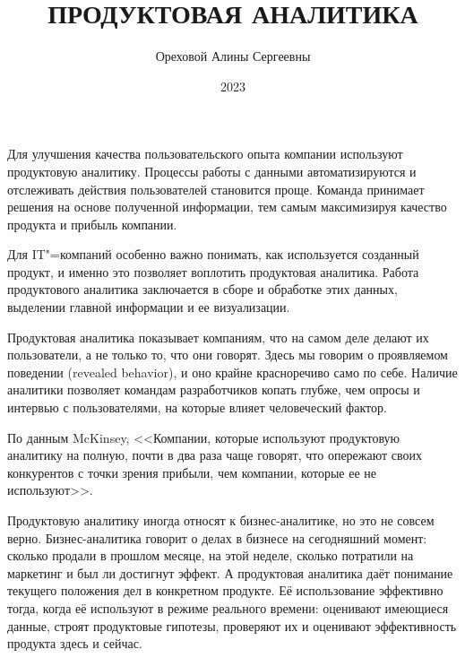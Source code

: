 \documentclass[referat, times]{SCWorks}
\begin{document}

\title{ПРОДУКТОВАЯ АНАЛИТИКА}




\author{Ореховой Алины Сергеевны}

\date{2023}

\maketitle

\tableofcontents

\intro
Для улучшения качества пользовательского опыта компании используют продуктовую аналитику. Процессы работы с данными автоматизируются и отслеживать действия пользователей становится проще. Команда принимает решения на основе полученной информации, тем самым максимизируя качество продукта и прибыль компании.

Для IT"=компаний особенно важно понимать, как используется созданный продукт, и именно это позволяет воплотить продуктовая аналитика. Работа продуктового аналитика заключается в сборе и обработке этих данных, выделении главной информации и ее визуализации.

Продуктовая аналитика показывает компаниям, что на самом деле делают их пользователи, а не только то, что они говорят. Здесь мы говорим о проявляемом поведении (revealed behavior), и оно крайне красноречиво само по себе. Наличие аналитики позволяет командам разработчиков копать глубже, чем опросы и интервью с пользователями, на которые влияет человеческий фактор. 

По данным McKinsey, <<Компании, которые используют продуктовую аналитику на полную, почти в два раза чаще говорят, что опережают своих конкурентов с точки зрения прибыли, чем компании, которые ее не используют>>\cite{mckinsey}. 

Продуктовую аналитику иногда относят к бизнес-аналитике, но это не совсем верно. Бизнес-аналитика говорит о делах в бизнесе на сегодняшний момент: сколько продали в прошлом месяце, на этой неделе, сколько потратили на маркетинг и был ли достигнут эффект. А продуктовая аналитика даёт понимание текущего положения дел в конкретном продукте. Её использование эффективно тогда, когда её используют в режиме реального времени: оценивают имеющиеся данные, строят продуктовые гипотезы, проверяют их и оценивают эффективность продукта здесь и сейчас\cite{businessAnalysis}.
\end{document}

